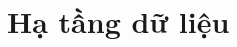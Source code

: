 \documentclass[../DoAn.tex]{subfiles}
\begin{document}







\section{Hạ tầng dữ liệu}
\label{section:3.4}
\end{document}
